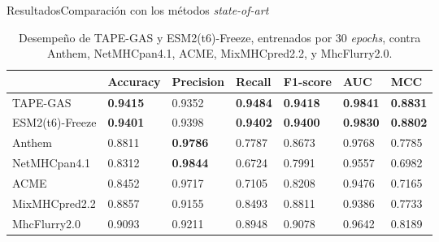 \documentclass[10pt]{beamer}
\newcommand{\1}{
	\setbeamertemplate{background}{
		\texttt{[image: img/1]}
		\tikz[overlay] \fill[fill opacity=0.75,fill=white] (0,0) rectangle (-\paperwidth,\paperheight);
	}
}
\begin{document}
\begin{frame}{Resultados}{Comparación con los métodos \textit{state-of-art}}
	\begin{table}[]
		\centering
		\caption{Desempeño de TAPE-GAS y ESM2(t6)-Freeze, entrenados por 30 \textit{epochs}, contra Anthem, NetMHCpan4.1, ACME, MixMHCpred2.2, y MhcFlurry2.0.}
		\setlength{\tabcolsep}{0.5em} %
		{\renewcommand{\arraystretch}{1.5}%
			\scriptsize
			\begin{tabular}{lllllll} 
				& \textbf{Accuracy} & \textbf{Precision} & \textbf{Recall} & \textbf{F1-score} & \textbf{AUC}    & \textbf{MCC}    \\ \hline
				TAPE-GAS        & \textbf{0.9415}   & 0.9352             & \textbf{0.9484} & \textbf{0.9418}   & \textbf{0.9841} & \textbf{0.8831} \\
				ESM2(t6)-Freeze & \textbf{0.9401}   & 0.9398             & \textbf{0.9402} & \textbf{0.9400}   & \textbf{0.9830} & \textbf{0.8802} \\
				
				Anthem          & 0.8811            & \textbf{0.9786}    & 0.7787          & 0.8673            & 0.9768          & 0.7785          \\
				NetMHCpan4.1    & 0.8312            & \textbf{0.9844}    & 0.6724          & 0.7991            & 0.9557          & 0.6982          \\
				
				ACME            & 0.8452            & 0.9717             & 0.7105          & 0.8208            & 0.9476          & 0.7165          \\
				MixMHCpred2.2   & 0.8857            & 0.9155             & 0.8493          & 0.8811            & 0.9386          & 0.7733          \\
				MhcFlurry2.0    & 0.9093            & 0.9211             & 0.8948          & 0.9078            & 0.9642          & 0.8189 \\         
		\end{tabular}}
	\end{table}
\end{frame}


\end{document}
